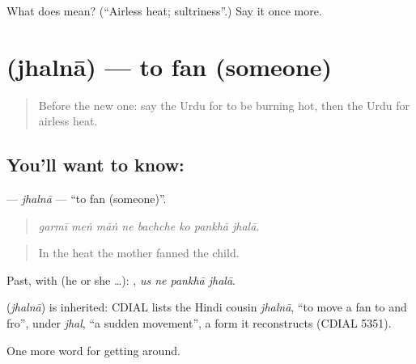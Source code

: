 \begin{tcolorbox}[breakable,colback=teal!4,colframe=teal!35!black,title={Before you move on}]
What does  mean? (\textquotedblleft{}Airless heat; sultriness\textquotedblright{}.) Say it once more.
\end{tcolorbox}
\section[\texorpdfstring{\ur{جھلنا} (jhalnā)}{جھلنا (jhalnā)}]{ (jhalnā) — to fan (someone)}

\label{lesson:UR-C430-jhalna}



\begin{quote}
Before the new one: say the Urdu for to be burning hot, then the Urdu for airless heat.
\end{quote}

\subsection*{You'll want to know: }
\textbf{} — \emph{jhalnā} — \textquotedblleft{}to fan (someone)\textquotedblright{}.

\begin{quote}
       
\end{quote}

\begin{quote}
\emph{garmī meṅ māṅ ne bachche ko pankhā jhalā.}
\end{quote}

\begin{quote}
In the heat the mother fanned the child.
\end{quote}

Past, with  (he or she …):    , \emph{us ne pankhā jhalā}.

\begin{cousinweb}
\textbf{} (\emph{jhalnā}) is inherited: CDIAL lists the Hindi cousin \emph{jhalnā}, \textquotedblleft{}to move a fan to and fro\textquotedblright{}, under \emph{jhal}, \textquotedblleft{}a sudden movement\textquotedblright{}, a form it reconstructs (CDIAL 5351).
\end{cousinweb}

\begin{grammarlens}[title={What you've built}]
One more word for getting around.
\end{grammarlens}

